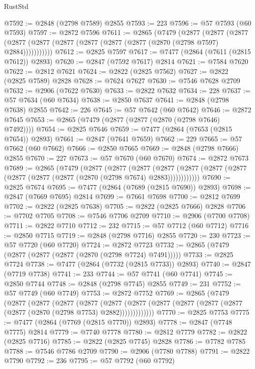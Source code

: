 \begin{lexlean}{RustStd}
\begin{coremodule}
@7592 := @2848 (@2798 @7589) @2855
@7593 := 223
@7596 := @57 @7593 (@60 @7593)
@7597 := @2872 @7596
@7611 := @2865
    (@7479
      (@2877
        (@2877
          (@2877 (@2877 (@2877 (@2877 (@2877 (@2877 (@2877 (@2870 (@2798 @7597) @2884)))))))))))
@7612 := @2825 @7597
@7617 := @7477 (@2864 (@7611 (@2815 @7612)) @2893)
@7620 := @2847 (@7592 @7617) @2814
@7621 := @7584 @7620
@7622 := @2812 @7621
@7624 := @2822 (@2825 @7562)
@7627 := @2822 (@2825 @7589) @2828
@7628 := @7624 @7627
@7630 := @7546 @7628 @2709
@7632 := @2906 (@7622 @7630)
@7633 := @2822 @7632
@7634 := 228
@7637 := @57 @7634 (@60 @7634)
@7638 := @2850 @7637
@7641 := @2848 (@2798 @7638) @2855
@7642 := 226
@7645 := @57 @7642 (@60 @7642)
@7646 := @2872 @7645
@7653 := @2865 (@7479 (@2877 (@2877 (@2870 (@2798 @7646) @7492))))
@7654 := @2825 @7646
@7659 := @7477 (@2864 (@7653 (@2815 @7654)) @2893)
@7661 := @2847 (@7641 @7659)
@7662 := 229
@7665 := @57 @7662 (@60 @7662)
@7666 := @2850 @7665
@7669 := @2848 (@2798 @7666) @2855
@7670 := 227
@7673 := @57 @7670 (@60 @7670)
@7674 := @2872 @7673
@7689 := @2865
    (@7479
      (@2877
        (@2877
          (@2877
            (@2877 (@2877 (@2877 (@2877 (@2877 (@2877 (@2877 (@2870 (@2798 @7674) @2883))))))))))))
@7690 := @2825 @7674
@7695 := @7477 (@2864 (@7689 (@2815 @7690)) @2893)
@7698 := @2847 (@7669 @7695) @2814
@7699 := @7661 @7698
@7700 := @2812 @7699
@7702 := @2822 (@2825 @7638)
@7705 := @2822 (@2825 @7666) @2828
@7706 := @7702 @7705
@7708 := @7546 @7706 @2709
@7710 := @2906 (@7700 @7708)
@7711 := @2822 @7710
@7712 := 232
@7715 := @57 @7712 (@60 @7712)
@7716 := @2850 @7715
@7719 := @2848 (@2798 @7716) @2855
@7720 := 230
@7723 := @57 @7720 (@60 @7720)
@7724 := @2872 @7723
@7732 := @2865 (@7479 (@2877 (@2877 (@2877 (@2870 (@2798 @7724) @7491)))))
@7733 := @2825 @7724
@7738 := @7477 (@2864 (@7732 (@2815 @7733)) @2893)
@7740 := @2847 (@7719 @7738)
@7741 := 233
@7744 := @57 @7741 (@60 @7741)
@7745 := @2850 @7744
@7748 := @2848 (@2798 @7745) @2855
@7749 := 231
@7752 := @57 @7749 (@60 @7749)
@7753 := @2872 @7752
@7769 := @2865
    (@7479
      (@2877
        (@2877
          (@2877
            (@2877
              (@2877
                (@2877 (@2877 (@2877 (@2877 (@2877 (@2877 (@2870 (@2798 @7753) @2882)))))))))))))
@7770 := @2825 @7753
@7775 := @7477 (@2864 (@7769 (@2815 @7770)) @2893)
@7778 := @2847 (@7748 @7775) @2814
@7779 := @7740 @7778
@7780 := @2812 @7779
@7782 := @2822 (@2825 @7716)
@7785 := @2822 (@2825 @7745) @2828
@7786 := @7782 @7785
@7788 := @7546 @7786 @2709
@7790 := @2906 (@7780 @7788)
@7791 := @2822 @7790
@7792 := 236
@7795 := @57 @7792 (@60 @7792)

\end{coremodule}
\end{lexlean}
